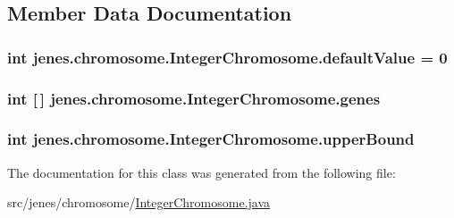 \subsection{Member Data Documentation}
\hypertarget{classjenes_1_1chromosome_1_1_integer_chromosome_ace33eab850d5e617cf77b5374d73754f}{
\subsubsection[{default\-Value}]{\setlength{\rightskip}{0pt plus 5cm}int jenes.\-chromosome.\-Integer\-Chromosome.\-default\-Value = 0\hspace{0.3cm}{\ttfamily [private]}}}\label{classjenes_1_1chromosome_1_1_integer_chromosome_ace33eab850d5e617cf77b5374d73754f}
\hypertarget{classjenes_1_1chromosome_1_1_integer_chromosome_aec15161ea0003d6881813558a2a0e657}{
\subsubsection[{genes}]{\setlength{\rightskip}{0pt plus 5cm}int \mbox{[}$\,$\mbox{]} jenes.\-chromosome.\-Integer\-Chromosome.\-genes\hspace{0.3cm}{\ttfamily [private]}}}\label{classjenes_1_1chromosome_1_1_integer_chromosome_aec15161ea0003d6881813558a2a0e657}
\hypertarget{classjenes_1_1chromosome_1_1_integer_chromosome_a8f49670d7d429ea62a3cf77949babe15}{
\subsubsection[{upper\-Bound}]{\setlength{\rightskip}{0pt plus 5cm}int jenes.\-chromosome.\-Integer\-Chromosome.\-upper\-Bound\hspace{0.3cm}{\ttfamily [private]}}}\label{classjenes_1_1chromosome_1_1_integer_chromosome_a8f49670d7d429ea62a3cf77949babe15}


The documentation for this class was generated from the following file\-:\begin{DoxyCompactItemize}
\item 
src/jenes/chromosome/\hyperlink{_integer_chromosome_8java}{Integer\-Chromosome.\-java}\end{DoxyCompactItemize}
